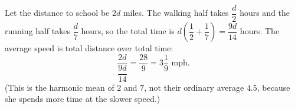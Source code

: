 Let the distance to school be $2d$ miles. The walking half takes $\dfrac {d}{2}$ hours and the running half takes $\dfrac {d}{7}$ hours, so the total time is $d\left(\dfrac{1}{2}+\dfrac{1}{7}\right)=\dfrac{9d}{14}$ hours. The average speed is total distance over total time:
\[
\dfrac{2d}{\dfrac{9d}{14}}=\dfrac{28}{9}=\boxed{3\dfrac{1}{9}\text{ mph}}.
\]
(This is the harmonic mean of $2$ and $7$, not their ordinary average $4.5$, because she spends more time at the slower speed.)

